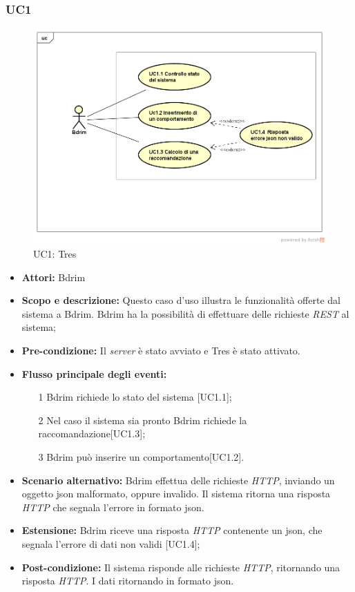 \subsubsection{UC1}
\begin{figure}[h]
\centering
\includegraphics[scale=0.42]{immagini/UC1a}
\caption{UC1: Tres}
\label{fig:UC1}
\end{figure}
\begin{itemize}
\item \textbf{Attori:} Bdrim
\item \textbf{Scopo e descrizione:} Questo caso d'uso illustra le funzionalità offerte dal sistema a Bdrim. Bdrim ha la possibilità di effettuare delle richieste \emph{REST} al sistema;
\item \textbf{Pre-condizione:} Il \emph{server} è stato avviato e Tres è stato attivato.
\item \textbf{Flusso principale degli eventi:}
\begin{itemize}
\item[1] Bdrim richiede lo stato del sistema [UC1.1];
\item[2] Nel caso il sistema sia pronto Bdrim richiede la raccomandazione[UC1.3];
\item[3] Bdrim può inserire un comportamento[UC1.2].
\end{itemize}
\item \textbf{Scenario alternativo:} Bdrim effettua delle richieste \emph{HTTP}, inviando un oggetto \gls{json} malformato, oppure invalido. Il sistema ritorna una risposta \emph{HTTP} che segnala l'errore in formato \gls{json}. 
\item \textbf{Estensione:} Bdrim riceve una risposta \emph{HTTP} contenente un \gls{json}, che segnala l'errore di dati non validi [UC1.4];
\item \textbf{Post-condizione:} Il sistema risponde alle richieste \emph{HTTP}, ritornando una risposta \emph{HTTP}. I dati ritornando in formato \gls{json}.
\end{itemize}




